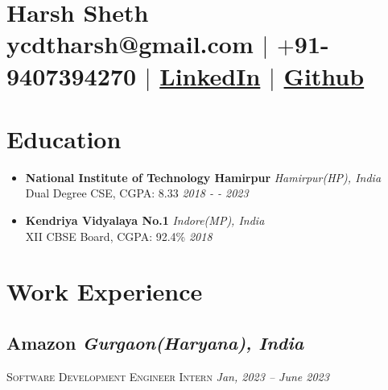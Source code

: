 \documentclass[10pt]{article}
\begin{document}
\section{\Huge{Harsh Sheth}\\ \large \normalfont ycdtharsh@gmail.com $|$ \normalfont $+$91-9407394270 $|$  \href{https://www.linkedin.com/in/harsh-sheth-2101}{LinkedIn} $|$ \href{https://github.com/harsh-sheth}{Github}}

\section{Education}
\begin{itemize}
  \item{
      \textbf{National Institute of Technology Hamirpur} \hfill \textit{Hamirpur(HP), India}\\
      Dual Degree CSE, CGPA: 8.33 \hfill \textit{2018 - - 2023}
  } 
  \item{
      \textbf{Kendriya Vidyalaya No.1} \hfill \textit{Indore(MP), India}\\
      XII CBSE Board, CGPA: 92.4\% \hfill \textit{2018}
  }
\end{itemize}


\section{Work Experience}
\subsection*{Amazon \hfill \normalsize \normalfont \textit{Gurgaon(Haryana), India}}

\vspace{-1ex}
\textsc{\textmd{Software Development Engineer Intern}} \hfill \normalsize \textit{Jan, 2023 -- June 2023}
\vspace{-1ex}
\end{document}
